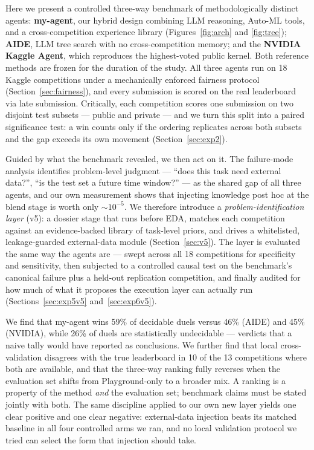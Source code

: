 \documentclass[11pt,a4paper]{article}
\begin{document}
Here we present a controlled three-way benchmark of methodologically distinct agents: \textbf{my-agent}, our hybrid design combining LLM reasoning, Auto-ML tools, and a cross-competition experience library (Figures~\ref{fig:arch} and \ref{fig:tree}); \textbf{AIDE}, LLM tree search with no cross-competition memory; and the \textbf{NVIDIA Kaggle Agent}, which reproduces the highest-voted public kernel. Both reference methods are frozen for the duration of the study. All three agents run on 18 Kaggle competitions under a mechanically enforced fairness protocol (Section~\ref{sec:fairness}), and every submission is scored on the real leaderboard via late submission. Critically, each competition scores one submission on two disjoint test subsets --- public and private --- and we turn this split into a paired significance test: a win counts only if the ordering replicates across both subsets and the gap exceeds its own movement (Section~\ref{sec:exp2}).

Guided by what the benchmark revealed, we then act on it. The failure-mode analysis identifies problem-level judgment --- ``does this task need external data?'', ``is the test set a future time window?'' --- as the shared gap of all three agents, and our own measurement shows that injecting knowledge post hoc at the blend stage is worth only ${\sim}10^{-5}$. We therefore introduce a \emph{problem-identification layer} (v5): a dossier stage that runs before EDA, matches each competition against an evidence-backed library of task-level priors, and drives a whitelisted, leakage-guarded external-data module (Section~\ref{sec:v5}). The layer is evaluated the same way the agents are --- swept across all 18 competitions for specificity and sensitivity, then subjected to a controlled causal test on the benchmark's canonical failure plus a held-out replication competition, and finally audited for how much of what it proposes the execution layer can actually run (Sections~\ref{sec:exp5v5} and~\ref{sec:exp6v5}).

We find that my-agent wins 59\% of decidable duels versus 46\% (AIDE) and 45\% (NVIDIA), while 26\% of duels are statistically undecidable --- verdicts that a naive tally would have reported as conclusions. We further find that local cross-validation disagrees with the true leaderboard in 10 of the 13 competitions where both are available, and that the three-way ranking fully reverses when the evaluation set shifts from Playground-only to a broader mix. A ranking is a property of the method \emph{and} the evaluation set; benchmark claims must be stated jointly with both. The same discipline applied to our own new layer yields one clear positive and one clear negative: external-data injection beats its matched baseline in all four controlled arms we ran, and no local validation protocol we tried can select the form that injection should take.
\end{document}
